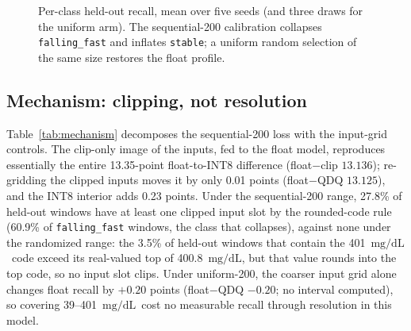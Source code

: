 \documentclass[10pt,twocolumn]{article}
\newcommand{\mgdl}{\ensuremath{\mathrm{mg/dL}}}
\begin{document}
\begin{figure}[t]
\centering
{}
\caption{Per-class held-out recall, mean over five seeds (and three draws
for the uniform arm). The sequential-200
calibration collapses \texttt{falling\_fast} and inflates \texttt{stable};
a uniform random selection of the same size restores the float profile.}
\label{fig:recall}
\end{figure}

\subsection{Mechanism: clipping, not resolution}
\label{sec:mechanism}

Table~\ref{tab:mechanism} decomposes the sequential-200 loss with the
input-grid controls. The clip-only image of the inputs, fed to the float
model, reproduces essentially the entire 13.35-point float-to-INT8
difference (float$-$clip $13.136$); re-gridding the clipped inputs moves it
by only 0.01 points (float$-$QDQ $13.125$), and the INT8 interior adds 0.23
points. Under the sequential-200 range, 27.8\% of held-out windows have at
least one clipped input slot by the rounded-code rule (60.9\% of
\texttt{falling\_fast} windows, the class that collapses), against none
under the randomized range: the 3.5\% of held-out windows that contain the
401~\mgdl\ code exceed its real-valued top of 400.8~\mgdl, but that value
rounds into the top code, so no input slot clips. Under uniform-200, the
coarser input grid alone changes float recall by $+0.20$ points
(float$-$QDQ $-0.20$; no interval computed), so covering
39--401~\mgdl\ cost no measurable recall through resolution in this
model.
\end{document}
